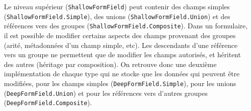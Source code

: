 Le niveau supérieur (\lstinline{ShallowFormField}) peut contenir des champs simples (\lstinline{ShallowFormField.Simple}), des unions (\lstinline{ShallowFormField.Union}) et des références vers des groupes (\lstinline{ShallowFormField.Composite}).
Dans un formulaire, il est possible de modifier certains aspects des champs provenant des groupes (arité, métadonnées d'un champ simple, etc).
Les descendants d'une référence vers un groupe ne permettent que de modifier les champs autorisés, et héritent des autres (héritage par composition).
On retrouve donc une deuxième implémentation de chaque type qui ne stocke que les données qui peuvent être modifiées, pour les champs simples (\lstinline{DeepFormField.Simple}), pour les unions (\lstinline{DeepFormField.Union}) et pour les références vers d'autres groupes (\lstinline{DeepFormField.Composite}).
